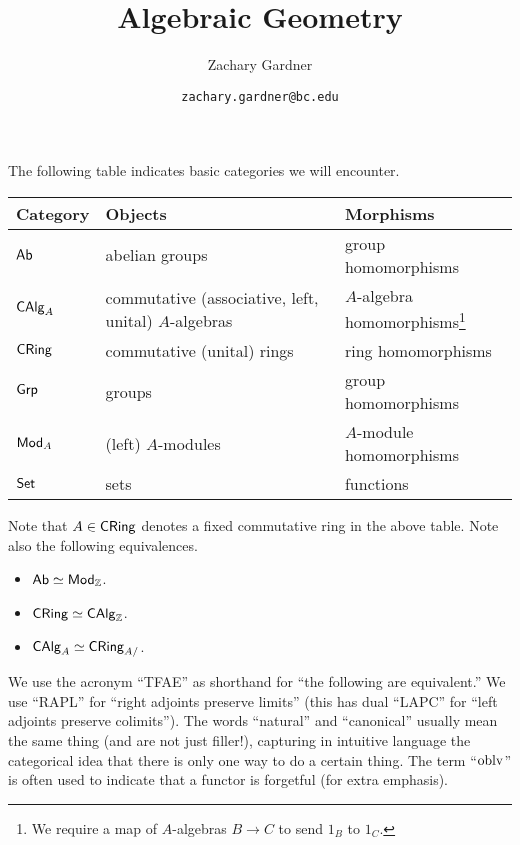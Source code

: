 \documentclass[11pt]{article}
\begin{document}
\title{Algebraic Geometry}
\author{Zachary Gardner}
\date{\texttt{zachary.gardner@bc.edu}}
\maketitle

The following table indicates basic categories we will encounter.
\begin{center}
\begin{tabular}{|l|l|l|}
\hline
Category & Objects & Morphisms \\
\hline
$\operatorname{\mathsf{Ab}}$ & abelian groups & group homomorphisms \\
$\operatorname{\mathsf{CAlg}}_A$ & commutative (associative, left, unital) $A$-algebras & $A$-algebra homomorphisms\footnote{We require a map of $A$-algebras $B\to C$ to send $1_B$ to $1_C$.} \\
$\operatorname{\mathsf{CRing}}$ & commutative (unital) rings & ring homomorphisms \\
$\operatorname{\mathsf{Grp}}$ & groups & group homomorphisms \\
$\operatorname{\mathsf{Mod}}_A$ & (left) $A$-modules & $A$-module homomorphisms \\
$\operatorname{\mathsf{Set}}$ & sets & functions \\
\hline
\end{tabular}
\end{center}

Note that $A\in\operatorname{\mathsf{CRing}}$ denotes a fixed commutative ring in the above table. Note also the following equivalences.
\begin{itemize}
\item $\operatorname{\mathsf{Ab}}\simeq\operatorname{\mathsf{Mod}}_{\mathbb{Z}}$.

\item $\operatorname{\mathsf{CRing}}\simeq\operatorname{\mathsf{CAlg}}_{\mathbb{Z}}$.

\item $\operatorname{\mathsf{CAlg}}_A\simeq\operatorname{\mathsf{CRing}}_{A/}$.
\end{itemize}

We use the acronym ``TFAE'' as shorthand for ``the following are equivalent.'' We use ``RAPL'' for ``right adjoints preserve limits'' (this has dual ``LAPC'' for ``left adjoints preserve colimits''). The words ``natural'' and ``canonical'' usually mean the same thing (and are not just filler!), capturing in intuitive language the categorical idea that there is only one way to do a certain thing. The term ``$\operatorname{oblv}$'' is often used to indicate that a functor is forgetful (for extra emphasis).

\newpage

\tableofcontents

\newpage
\end{document}
